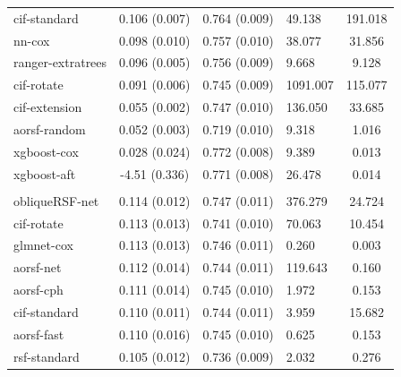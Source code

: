 \documentclass[twoside,11pt]{article}\usepackage[]{graphicx}\usepackage[]{xcolor}
\newenvironment{knitrout}{}{} %
\begin{document}
\begin{knitrout}
\begin{longtable}[t]{lcclc}
\hspace{1em}cif-standard & 0.106 (0.007) & 0.764 (0.009) & 49.138 & 191.018\\
\hspace{1em}nn-cox & 0.098 (0.010) & 0.757 (0.010) & 38.077 & 31.856\\
\hspace{1em}ranger-extratrees & 0.096 (0.005) & 0.756 (0.009) & 9.668 & 9.128\\
\hspace{1em}cif-rotate & 0.091 (0.006) & 0.745 (0.009) & 1091.007 & 115.077\\
\hspace{1em}cif-extension & 0.055 (0.002) & 0.747 (0.010) & 136.050 & 33.685\\
\hspace{1em}aorsf-random & 0.052 (0.003) & 0.719 (0.010) & 9.318 & 1.016\\
\hspace{1em}xgboost-cox & 0.028 (0.024) & 0.772 (0.008) & 9.389 & 0.013\\
\hspace{1em}xgboost-aft & -4.51 (0.336) & 0.771 (0.008) & 26.478 & 0.014\\
\addlinespace[0.3em]
\hline
\multicolumn{5}{l}{\textit{\textbf{Systolic Heart Failure; death, n = 2231, p = 41}}}\\
\hline
\hspace{1em}obliqueRSF-net & 0.114 (0.012) & 0.747 (0.011) & 376.279 & 24.724\\
\hspace{1em}cif-rotate & 0.113 (0.013) & 0.741 (0.010) & 70.063 & 10.454\\
\hspace{1em}glmnet-cox & 0.113 (0.013) & 0.746 (0.011) & 0.260 & 0.003\\
\hspace{1em}aorsf-net & 0.112 (0.014) & 0.744 (0.011) & 119.643 & 0.160\\
\hspace{1em}aorsf-cph & 0.111 (0.014) & 0.745 (0.010) & 1.972 & 0.153\\
\hspace{1em}cif-standard & 0.110 (0.011) & 0.744 (0.011) & 3.959 & 15.682\\
\hspace{1em}aorsf-fast & 0.110 (0.016) & 0.745 (0.010) & 0.625 & 0.153\\
\hspace{1em}rsf-standard & 0.105 (0.012) & 0.736 (0.009) & 2.032 & 0.276\\

\end{longtable}
\end{knitrout}
\end{document}
